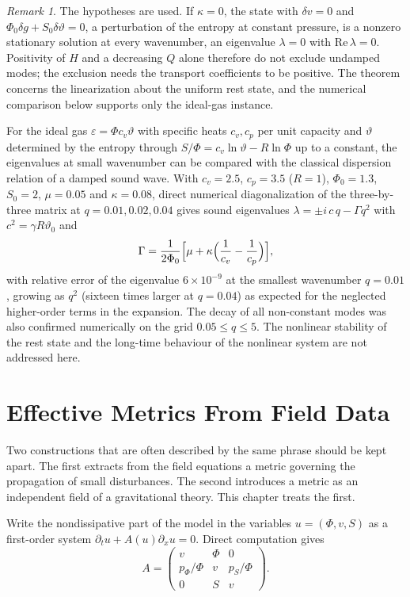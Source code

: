 \documentclass[11pt,oneside]{book}
\theoremstyle{definition}
\theoremstyle{remark}
\newtheorem{remark}[theorem]{Remark}
\begin{document}
\begin{remark}
The hypotheses are used. If $\kappa=0$, the state with $\delta v=0$ and $\Phi_0\delta g+S_0\delta\vartheta=0$, a perturbation of the entropy at constant pressure, is a nonzero stationary solution at every wavenumber, an eigenvalue $\lambda=0$ with $\mathrm{Re}\,\lambda=0$. Positivity of $H$ and a decreasing $Q$ alone therefore do not exclude undamped modes; the exclusion needs the transport coefficients to be positive. The theorem concerns the linearization about the uniform rest state, and the numerical comparison below supports only the ideal-gas instance.
\end{remark}

For the ideal gas $\varepsilon=\Phi c_v\vartheta$ with specific heats $c_v,c_p$ per unit capacity and $\vartheta$ determined by the entropy through $S/\Phi=c_v\ln\vartheta-R\ln\Phi$ up to a constant, the eigenvalues at small wavenumber can be compared with the classical dispersion relation of a damped sound wave. With $c_v=2.5$, $c_p=3.5$ ($R=1$), $\Phi_0=1.3$, $S_0=2$, $\mu=0.05$ and $\kappa=0.08$, direct numerical diagonalization of the three-by-three matrix at $q=0.01,0.02,0.04$ gives sound eigenvalues $\lambda=\pm i\,c\,q-\Gamma q^2$ with $c^2=\gamma R\vartheta_0$ and
\[
\Gamma=\frac{1}{2\Phi_0}\Bigl[\mu+\kappa\Bigl(\frac1{c_v}-\frac1{c_p}\Bigr)\Bigr],
\]
with relative error of the eigenvalue $6\times10^{-9}$ at the smallest wavenumber $q=0.01$, growing as $q^2$ (sixteen times larger at $q=0.04$) as expected for the neglected higher-order terms in the expansion. The decay of all non-constant modes was also confirmed numerically on the grid $0.05\leq q\leq5$. The nonlinear stability of the rest state and the long-time behaviour of the nonlinear system are not addressed here.

\chapter{Effective Metrics From Field Data}\label{ch:metric}

Two constructions that are often described by the same phrase should be kept apart. The first extracts from the field equations a metric governing the propagation of small disturbances. The second introduces a metric as an independent field of a gravitational theory. This chapter treats the first.

Write the nondissipative part of the model in the variables $u=(\Phi,v,S)$ as a first-order system $\partial_tu+A(u)\partial_xu=0$. Direct computation gives
\[
A=\begin{pmatrix}v&\Phi&0\\ p_\Phi/\Phi&v&p_S/\Phi\\0&S&v\end{pmatrix} .
\]
\end{document}
